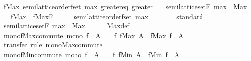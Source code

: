 \begin{isabellebody}
\ fMax{\isacharcolon}\ semilattice{\isacharunderscore}order{\isacharunderscore}fset\ max\ greater{\isacharunderscore}eq\ greater\isanewline
\ \ \ {\isachardoublequoteopen}semilattice{\isacharunderscore}set{\isachardot}F\ max\ {\isacharequal}\ Max{\isachardoublequoteclose}\isanewline
\ \ \ fMax\ {\isacharequal}\ fMax{\isachardot}F\isanewline
%
\isadelimproof
%
\endisadelimproof
%
\isatagproof
{}\isamarkupfalse%
\ {\isacharminus}\isanewline
\ \ \isamarkupfalse%
\ {\isachardoublequoteopen}semilattice{\isacharunderscore}order{\isacharunderscore}fset\ max\ {\isacharparenleft}{\isasymge}{\isacharparenright}\ {\isacharparenleft}{\isachargreater}{\isacharparenright}{\isachardoublequoteclose}\isanewline
\ \ \ \ \isamarkupfalse%
\ standard\isanewline
\isanewline
\ \ \isamarkupfalse%
\ {\isachardoublequoteopen}semilattice{\isacharunderscore}set{\isachardot}F\ max\ {\isacharequal}\ Max{\isachardoublequoteclose}\isanewline
\ \ \ \ \isamarkupfalse%
\ Max{\isacharunderscore}def\ \isacommand{{\isachardot}{\isachardot}}\isamarkupfalse%
\isanewline
{}\isamarkupfalse%
%
\endisatagproof
{\isafoldproof}%
%
\isadelimproof
\isanewline
%
\endisadelimproof
\isanewline
{}\isamarkupfalse%
\isanewline
\isanewline
{}\isamarkupfalse%
\ mono{\isacharunderscore}fMax{\isacharunderscore}commute{\isacharcolon}\ {\isachardoublequoteopen}mono\ f\ {\isasymLongrightarrow}\ A\ {\isasymnoteq}\ {\isacharbraceleft}{\isacharbar}{\isacharbar}{\isacharbraceright}\ {\isasymLongrightarrow}\ f\ {\isacharparenleft}fMax\ A{\isacharparenright}\ {\isacharequal}\ fMax\ {\isacharparenleft}f\ {\isacharbar}{\isacharbackquote}{\isacharbar}\ A{\isacharparenright}{\isachardoublequoteclose}\isanewline
%
\isadelimproof
\ \ %
\endisadelimproof
%
\isatagproof
{}\isamarkupfalse%
\ transfer\ {\isacharparenleft}rule\ mono{\isacharunderscore}Max{\isacharunderscore}commute{\isacharparenright}%
\endisatagproof
{\isafoldproof}%
%
\isadelimproof
\isanewline
%
\endisadelimproof
\isanewline
{}\isamarkupfalse%
\ mono{\isacharunderscore}fMin{\isacharunderscore}commute{\isacharcolon}\ {\isachardoublequoteopen}mono\ f\ {\isasymLongrightarrow}\ A\ {\isasymnoteq}\ {\isacharbraceleft}{\isacharbar}{\isacharbar}{\isacharbraceright}\ {\isasymLongrightarrow}\ f\ {\isacharparenleft}fMin\ A{\isacharparenright}\ {\isacharequal}\ fMin\ {\isacharparenleft}f\ {\isacharbar}{\isacharbackquote}{\isacharbar}\ A{\isacharparenright}{\isachardoublequoteclose}\isanewline

\end{isabellebody}
